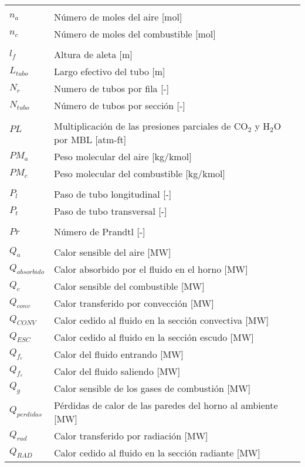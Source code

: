 \begin{tabular}{ll}
\\
\\
$n_a$  & Número de moles del aire [mol] \\
$n_c$  & Número de moles del combustible [mol] \\
\\
$l_f$   & Altura de aleta [m] \\
$L_{tubo}$ & Largo efectivo del tubo [m] \\
$N_r$   & Numero de tubos por fila [-] \\
$N_{tubo}$ & Número de tubos por sección [-] \\
\\
$PL$    & \multirow{2}{26em}{Multiplicación de las presiones parciales de CO$_2$ y H$_2$O por MBL [atm-ft]} \\
\\
$PM_a$    & Peso molecular del aire [kg/kmol]\\
$PM_c$    & Peso molecular del combustible [kg/kmol]\\
\\
$P_l$   & Paso de tubo longitudinal [-]\\
$P_t$   & Paso de tubo transversal [-]\\
\\
$Pr$    & Número de Prandtl [-]\\
\\
$Q_{a}$    & Calor sensible del aire [MW] \\
$Q_{absorbido}$ & Calor absorbido por el fluido en el horno [MW] \\
$Q_{c}$    & Calor sensible del combustible [MW] \\
$Q_{conv}$ & Calor transferido por convección [MW] \\
$Q_{CONV}$ & Calor cedido al fluido en la sección convectiva [MW] \\
$Q_{ESC}$ & Calor cedido al fluido en la sección escudo [MW] \\
$Q_{f_e}$ & Calor del fluido entrando [MW] \\
$Q_{f_s}$ & Calor del fluido saliendo [MW] \\
$Q_{g}$   & Calor sensible de los gases de combustión [MW] \\
$Q_{perdidas}$  & Pérdidas de calor de las paredes del horno al ambiente [MW] \\
$Q_{rad}$ & Calor transferido por radiación [MW] \\
$Q_{RAD}$ & Calor cedido al fluido en la sección radiante [MW] \\

\end{tabular}

